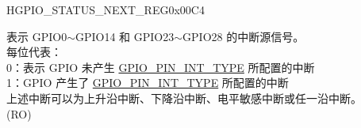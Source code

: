 \begin{register}{H}{GPIO\_STATUS\_NEXT\_REG}{0x00C4}\label{regdesc:GPIOSTATUSNEXTREG}
%
\regnewline%
\begin{regdesc}\begin{reglist}
\label{fielddesc:GPIOSTATUSINTERRUPTNEXT}\item [GPIO\_STATUS\_INTERRUPT\_NEXT] 表示 GPIO0$\sim$GPIO14 和 GPIO23$\sim$GPIO28 的中断源信号。\\
每位代表：\\
0：表示 GPIO 未产生 \hyperref[fielddesc:GPIOPINNINTTYPE]{GPIO\_PIN\_INT\_TYPE} 所配置的中断\\
1：GPIO 产生了 \hyperref[fielddesc:GPIOPINNINTTYPE]{GPIO\_PIN\_INT\_TYPE} 所配置的中断\\
上述中断可以为上升沿中断、下降沿中断、电平敏感中断或任一沿中断。\\ (RO)
\end{reglist}\end{regdesc}
\end{register}


